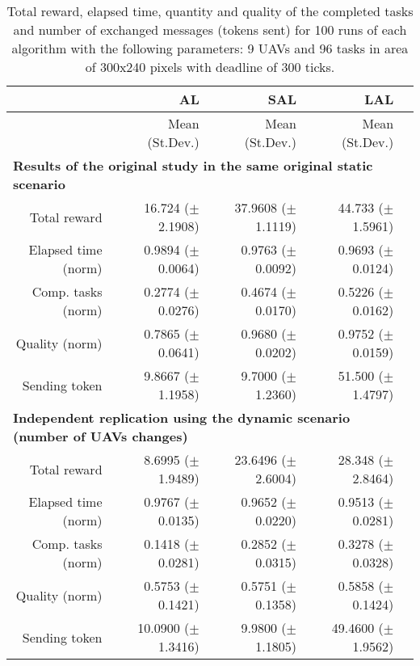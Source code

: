 \begin{table}%
	\small
	\fontsize{6}{6}\selectfont
	\centering
	\caption{Total reward, elapsed time, quantity and quality of the completed tasks and number of exchanged messages (tokens sent) for 100 runs of each algorithm with the following parameters: 9 UAVs and 96 tasks in area of 300x240 pixels with deadline of 300 ticks.}
	\label{table:table01}
	
	\begin{tabular}{rrrrr} \hline
		& AL
		& SAL
		& LAL \\ \hline 
		
		& Mean (St.Dev.)  & Mean (St.Dev.)  & Mean (St.Dev.)  \\ [1ex]
		
		\multicolumn{5}{l}{\textbf{Results of the original study in the same original static scenario}} \\
	Total reward           & 16.724   ($\pm$2.1908)  & 37.9608  ($\pm$1.1119) & 44.733  ($\pm$1.5961)   \\
	Elapsed time (norm)    & 0.9894   ($\pm$0.0064)  &  0.9763  ($\pm$0.0092) & 0.9693  ($\pm$0.0124)    \\ 
	Comp. tasks (norm)     & 0.2774   ($\pm$0.0276)  &  0.4674  ($\pm$0.0170) & 0.5226  ($\pm$0.0162)    \\ 
	Quality (norm)         & 0.7865   ($\pm$0.0641)  &  0.9680  ($\pm$0.0202) & 0.9752  ($\pm$0.0159)   \\ 
	Sending token          &  9.8667  ($\pm$1.1958)  &  9.7000  ($\pm$1.2360) & 51.500 ($\pm$1.4797)   \\ [1ex]
		
		\multicolumn{5}{l}{\textbf{Independent replication using the dynamic scenario (number of UAVs changes)}} \\
	Total reward           & 8.6995  ($\pm$1.9489)  & 23.6496 ($\pm$2.6004) &  28.348  ($\pm$2.8464)  \\
	Elapsed time (norm)    & 0.9767  ($\pm$0.0135)  & 0.9652  ($\pm$0.0220) &  0.9513  ($\pm$0.0281)  \\ 
	Comp. tasks (norm)     & 0.1418  ($\pm$0.0281)  & 0.2852  ($\pm$0.0315) &  0.3278  ($\pm$0.0328)  \\ 
	Quality (norm)         & 0.5753  ($\pm$0.1421)  & 0.5751  ($\pm$0.1358) &  0.5858  ($\pm$0.1424)  \\ 
	Sending token          & 10.0900 ($\pm$1.3416)  & 9.9800  ($\pm$1.1805) &  49.4600 ($\pm$1.9562)  \\ [1ex]

		\hline
	\end{tabular}
\end{table} 




